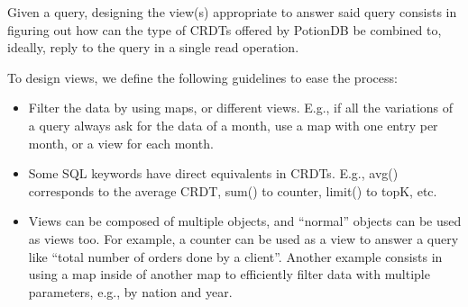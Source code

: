 \documentclass{vldb}
\newcommand{\grumbler}[2]{{\color{red}{\bf #1:} #2}}
\renewcommand{\grumbler}[2]{}
\newcommand{\andre}[1]{\grumbler{andre}{#1}}
\begin{document}
\andre{I think having a scheme (image) to show the resulting view of a query, as well as how it is accessed, would be useful. I'll work on that later on.}

\andre{I selected to explain the query 18 (Q18). Here's my thoughts behind each query implemented in PotionDB: \\
- Q3 is not complicated to explain, however the motivation query is too specific (not an interesting ``question'' to answer). \\
- Q5 is easy to explain, has good motivation, but data is local to a region. \\
- Q11 is somewhat tough to explain (complicated SQL query). Decent motivation query. Also the views for this don't need updates.\\
- Q14 is too simple. It has a good motivation query however. \\
- Q15 is okay to explain, has good motivation query, but it's the only query where TPC-H authors themselves define a view. \\
- Q18 has a decent motivation query, is okay to explain. Uses topK too.
}

Given a query, designing the view(s) appropriate to answer said query consists in figuring out how can the type of CRDTs offered by PotionDB be combined to, ideally, reply to the query in a single read operation.

To design views, we define the following guidelines to ease the process:

\begin{itemize}
	\item Filter the data by using maps, or different views. E.g., if all the variations of a query always ask for the data of a month, use a map with one entry per month, or a view for each month.
	\item Some SQL keywords have direct equivalents in CRDTs. E.g., avg() corresponds to the average CRDT, sum() to counter, limit() to topK, etc.
	\item Views can be composed of multiple objects, and ``normal'' objects can be used as views too.
	For example, a counter can be used as a view to answer a query like ``total number of orders done by a client''.
	Another example consists in using a map inside of another map to efficiently filter data with multiple parameters, e.g., by nation and year.
\end{itemize}
\end{document}

